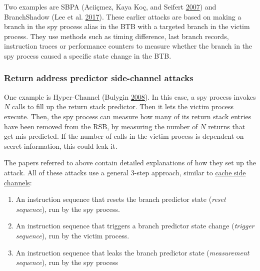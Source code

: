 \documentclass[a4paper,]{report}
\providecommand{\tightlist}{%
  \setlength{\itemsep}{0pt}\setlength{\parskip}{0pt}}
\begin{document}
Two examples are SBPA (Aciiçmez, Kaya Koç, and Seifert
\protect\hyperlink{ref-Aciicmez2007}{2007}) and BranchShadow
(Lee et al. \protect\hyperlink{ref-Lee2017}{2017}).
These earlier attacks are based on making a branch in the spy process
alias in the BTB with a targeted branch in the victim
process. They use methods such as timing difference, last branch
records, instruction
traces or performance
counters to measure whether the branch in the
spy process caused a specific state change in the BTB.

\hypertarget{return-address-predictor-side-channel-attacks}{%
\subsubsection{Return address predictor side-channel
attacks}\label{return-address-predictor-side-channel-attacks}}


One example is Hyper-Channel (Bulygin
\protect\hyperlink{ref-Bulygin2008}{2008}). In this
case, a spy process invokes \(N\) calls to fill up the return stack
predictor. Then it lets the victim process execute. Then, the spy
process can measure how many of its return stack entries have been
removed from the RSB, by measuring the number of \(N\) returns that get
mis-predicted. If the number of calls in the victim process is dependent
on secret information, this could leak it.

The papers referred to above contain detailed explanations of how they
set up the attack. All of these attacks use a general 3-step approach,
similar to
\protect\hyperlink{general-schema-for-cache-covert-channels}{cache side
channels}:

\begin{enumerate}
\def\labelenumi{\arabic{enumi}.}
\tightlist
\item
  An instruction sequence that resets the branch predictor state
  (\emph{reset sequence}), run by the spy process.
\item
  An instruction sequence that triggers a branch predictor state change
  (\emph{trigger sequence}), run by the victim
  process.
\item
  An instruction sequence that leaks the branch predictor state
  (\emph{measurement sequence}), run by the spy
  process
\end{enumerate}
\end{document}
